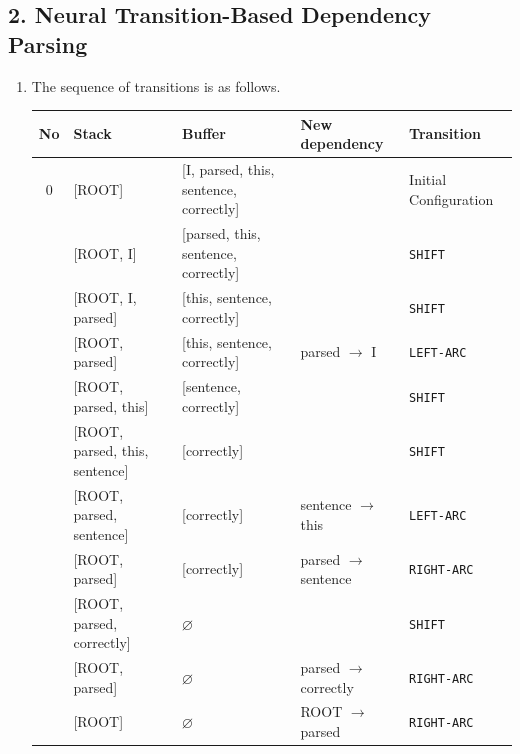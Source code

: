 \documentclass[a4paper]{article}
\newcommand\showrowno{\stepcounter{rowno}\therowno}
\begin{document}
\subsection*{2. Neural Transition-Based Dependency Parsing}

    \begin{enumerate}[label=(\alph*)]
        \item The sequence of transitions is as follows.
        \begin{table}[h]
            \setcounter{rowno}{0}
            \begin{tabular}{c|l|l|l|l}
                No & Stack & Buffer & New dependency & Transition \\
                \hline
                0 & [ROOT] & [I, parsed, this, sentence, correctly] & & Initial Configuration \\
                \showrowno & [ROOT, I] & [parsed, this, sentence, correctly] & & \texttt{SHIFT}  \\
                \showrowno & [ROOT, I, parsed] & [this, sentence, correctly] & & \texttt{SHIFT}  \\
                \showrowno & [ROOT, parsed] & [this, sentence, correctly] & parsed $\rightarrow$ I & \texttt{LEFT-ARC} \\ 
                \showrowno & [ROOT, parsed, this] & [sentence, correctly] & & \texttt{SHIFT} \\ 
                \showrowno & [ROOT, parsed, this, sentence] & [correctly] & & \texttt{SHIFT} \\ 
                \showrowno & [ROOT, parsed, sentence] & [correctly] & sentence $\rightarrow$ this & \texttt{LEFT-ARC} \\ 
                \showrowno & [ROOT, parsed] & [correctly] & parsed $\rightarrow$ sentence & \texttt{RIGHT-ARC} \\ 
                \showrowno & [ROOT, parsed, correctly] & $\varnothing$ & & \texttt{SHIFT} \\ 
                \showrowno & [ROOT, parsed] & $\varnothing$ & parsed $\rightarrow$ correctly & \texttt{RIGHT-ARC} \\ 
                \showrowno & [ROOT] & $\varnothing$ & ROOT $\rightarrow$ parsed & \texttt{RIGHT-ARC} \\ 
            \end{tabular}
        \end{table} 


\end{enumerate}
\end{document}
